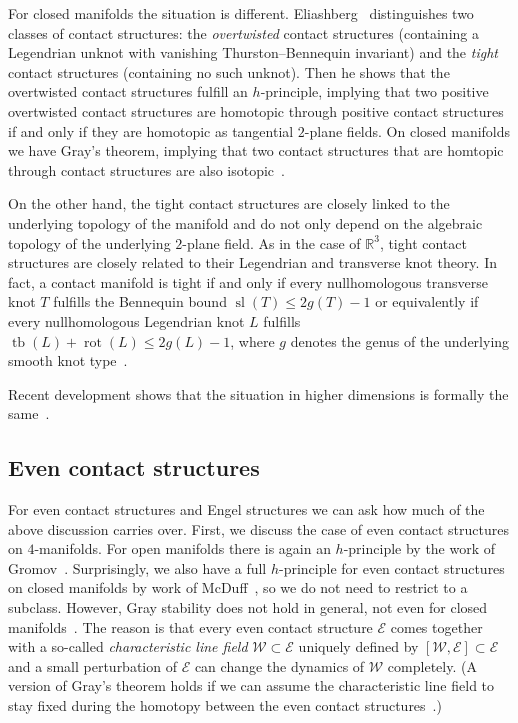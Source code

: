 \documentclass{amsart} %
\DeclareMathOperator{\tb}{tb}
\DeclareMathOperator{\rot}{rot}
\DeclareMathOperator{\slf}{sl}
\newcommand{\R}{\mathbb{R}}
\newcommand{\E}{\mathcal{E}}
\newcommand{\W}{\mathcal{W}}
\theoremstyle{thm}
\theoremstyle{definition}
\begin{document}
For closed manifolds the situation is different. Eliashberg~\cite{El89} distinguishes two classes of contact structures: the \textit{overtwisted} contact structures (containing a Legendrian unknot with vanishing Thurston--Bennequin invariant) and the \textit{tight} contact structures (containing no such unknot). Then he shows that the overtwisted contact structures fulfill an $h$-principle, implying that two positive overtwisted contact structures are homotopic through positive contact structures if and only if they are homotopic as tangential $2$-plane fields. On closed manifolds we have Gray's theorem, implying that two contact structures that are homtopic through contact structures are also isotopic~\cite{Ge08}.
 
On the other hand, the tight contact structures are closely linked to the underlying topology of the manifold and do not only depend on the algebraic topology of the underlying $2$-plane field. As in the case of $\R^3$, tight contact structures are closely related to their Legendrian and transverse knot theory. In fact, a contact manifold is tight if and only if every nullhomologous transverse knot $T$ fulfills the Bennequin bound $\slf(T)\leq2g(T)-1$ or equivalently if every nullhomologous Legendrian knot $L$ fulfills $\tb(L)+\rot(L)\leq2g(L)-1$, where $g$ denotes the genus of the underlying smooth knot type~\cite{El93}.
 
Recent development shows that the situation in higher dimensions is formally the same~\cite{BEM15}. %
\subsection{Even contact structures}
For even contact structures and Engel structures we can ask how much of the above discussion carries over. First, we discuss the case of even contact structures on $4$-manifolds. For open manifolds there is again an $h$-principle by the work of Gromov~\cite{Gr86}. Surprisingly, we also have a full $h$-principle for even contact structures on closed manifolds by work of McDuff~\cite{Mc87}, so we do not need to restrict to a subclass. However, Gray stability does not hold in general, not even for closed manifolds~\cite{Mo99}. The reason is that every even contact structure $\E$ comes together with a so-called \textit{characteristic line field} $\W\subset\E$ uniquely defined by $[\W,\E]\subset \E$ and a small perturbation of $\E$ can change the dynamics of $\W$ completely. (A version of Gray's theorem holds if we can assume the characteristic line field to stay fixed during the homotopy between the even contact structures~\cite{Go97}.)
\end{document}
